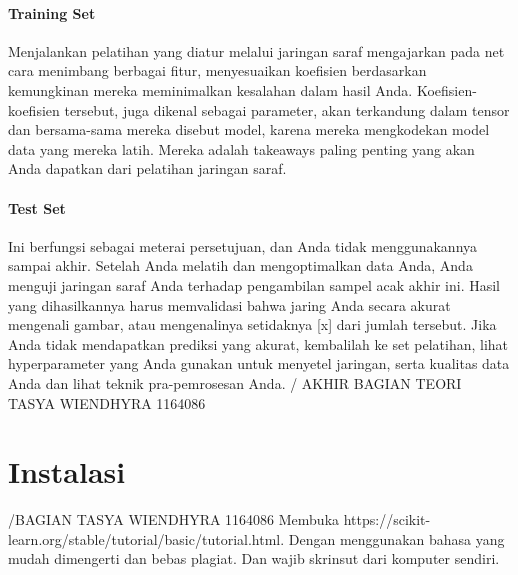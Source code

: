 \paragraph{Training Set} \hspace{0pt} \par
Menjalankan pelatihan yang diatur melalui jaringan saraf mengajarkan pada net cara menimbang berbagai fitur, menyesuaikan koefisien berdasarkan kemungkinan mereka meminimalkan kesalahan dalam hasil Anda.
Koefisien-koefisien tersebut, juga dikenal sebagai parameter, akan terkandung dalam tensor dan bersama-sama mereka disebut model, karena mereka mengkodekan model data yang mereka latih. Mereka adalah takeaways paling penting yang akan Anda dapatkan dari pelatihan jaringan saraf.

\paragraph{Test Set} \hspace{0pt} \par
Ini berfungsi sebagai meterai persetujuan, dan Anda tidak menggunakannya sampai akhir. Setelah Anda melatih dan mengoptimalkan data Anda, Anda menguji jaringan saraf Anda terhadap pengambilan sampel acak akhir ini. Hasil yang dihasilkannya harus memvalidasi bahwa jaring Anda secara akurat mengenali gambar, atau mengenalinya setidaknya [x] dari jumlah tersebut. Jika Anda tidak mendapatkan prediksi yang akurat, kembalilah ke set pelatihan, lihat hyperparameter yang Anda gunakan untuk menyetel jaringan, serta kualitas data Anda dan lihat teknik pra-pemrosesan Anda.
/ AKHIR BAGIAN  TEORI TASYA WIENDHYRA 1164086

\section{Instalasi} /BAGIAN TASYA WIENDHYRA 1164086
Membuka https://scikit-learn.org/stable/tutorial/basic/tutorial.html. Dengan menggunakan bahasa yang mudah dimengerti dan bebas plagiat.  Dan wajib skrinsut dari komputer sendiri.

